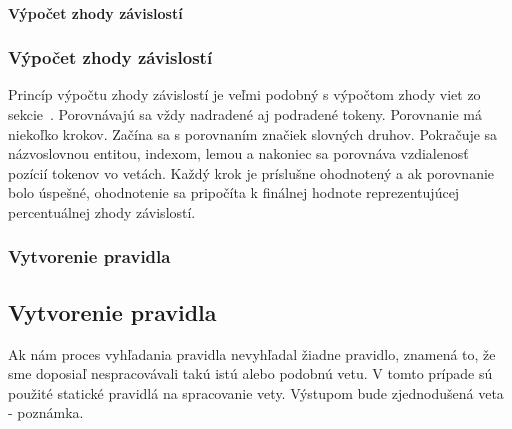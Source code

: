 %
%
{
	\paragraph{Výpočet zhody závislostí}
}
{
	\subsubsection{Výpočet zhody závislostí}
}
\label{paragraph:dependency_match}

Princíp výpočtu zhody závislostí je veľmi podobný s výpočtom zhody viet zo sekcie~. Porovnávajú sa vždy nadradené aj podradené tokeny. Porovnanie má niekoľko krokov. Začína sa s porovnaním značiek slovných druhov. Pokračuje sa názvoslovnou entitou, indexom, lemou a nakoniec sa porovnáva vzdialenosť pozícií tokenov vo vetách. Každý krok je príslušne ohodnotený a ak porovnanie bolo úspešné, ohodnotenie sa pripočíta k finálnej hodnote reprezentujúcej percentuálnej zhody závislostí.

%
%
{
	\subsubsection{Vytvorenie pravidla}
}
{
	\subsection{Vytvorenie pravidla}
}
\label{subsubsection:rule_creation}
Ak nám proces vyhľadania pravidla nevyhľadal žiadne pravidlo, znamená to, že sme doposiaľ nespracovávali takú istú alebo podobnú vetu. V tomto prípade sú použité statické pravidlá na spracovanie vety. Výstupom bude zjednodušená veta - poznámka.


